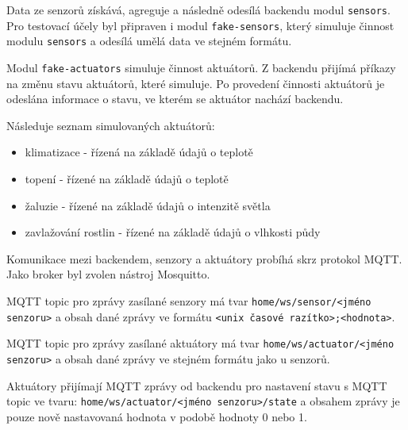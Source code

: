 \documentclass[11pt,a4paper]{article}
\begin{document}
Data ze senzorů získává, agreguje a následně odesílá backendu modul \texttt{sensors}.
Pro testovací účely byl připraven i modul \texttt{fake-sensors}, který simuluje
činnost modulu \texttt{sensors} a odesílá umělá data ve stejném formátu.

Modul \texttt{fake-actuators} simuluje činnost aktuátorů.
Z backendu přijímá příkazy na změnu stavu aktuátorů, které simuluje.
Po provedení činnosti aktuátorů je odeslána informace o stavu, ve kterém
se aktuátor nachází backendu.

Následuje seznam simulovaných aktuátorů:
\begin{itemize}
    \item klimatizace - řízená na základě údajů o teplotě
    \item topení - řízené na základě údajů o teplotě
    \item žaluzie - řízené na základě údajů o intenzitě světla
    \item zavlažování rostlin - řízené na základě údajů o vlhkosti půdy
\end{itemize}

Komunikace mezi backendem, senzory a aktuátory probíhá skrz protokol MQTT. Jako broker byl zvolen nástroj Mosquitto.

MQTT topic pro zprávy zasílané senzory má tvar \texttt{home/ws/sensor/<jméno senzoru>} a obsah dané zprávy ve formátu \texttt{<unix časové razítko>;<hodnota>}.

MQTT topic pro zprávy zasílané aktuátory má tvar \texttt{home/ws/actuator/<jméno senzoru>} a obsah dané zprávy ve stejném formátu jako u senzorů.

Aktuátory přijímají MQTT zprávy od backendu pro nastavení stavu s MQTT topic ve tvaru: \texttt{home/ws/actuator/<jméno senzoru>/state} a obsahem zprávy je pouze nově nastavovaná hodnota v podobě hodnoty 0 nebo 1.
\end{document}

